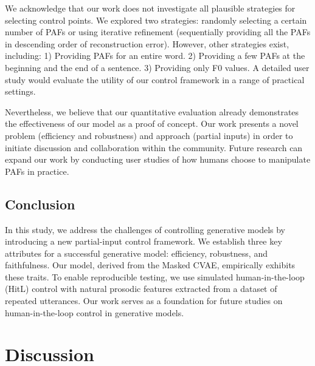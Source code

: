 \documentclass[a4paper,12pt,twoside,openright]{report}
\newcommand{\crit}[1]{\textcolor{red}{#1}}
\begin{document}
We acknowledge that our work does not investigate all plausible strategies for selecting control points. We explored two strategies: randomly selecting a certain number of PAFs or using iterative refinement (sequentially providing all the PAFs in descending order of reconstruction error). However, other strategies exist, including: 1) Providing PAFs for an entire word. 2) Providing a few PAFs at the beginning and the end of a sentence. 3) Providing only F0 values. A detailed user study would evaluate the utility of our control framework in a range of practical settings.

Nevertheless, we believe that our quantitative evaluation already demonstrates the effectiveness of our model as a proof of concept. Our work presents a novel problem (efficiency and robustness) and approach (partial inputs) in order to initiate discussion and collaboration within the community. Future research can expand our work by conducting user studies of how humans choose to manipulate PAFs in practice.

\subsection{Conclusion}

In this study, we address the challenges of controlling generative models by introducing a new partial-input control framework. We establish three key attributes for a successful generative model: efficiency, robustness, and faithfulness. Our model, derived from the Masked CVAE, empirically exhibits these traits. To enable reproducible testing, we use simulated human-in-the-loop (HitL) control with natural prosodic features extracted from a dataset of repeated utterances. Our work serves as a foundation for future studies on human-in-the-loop control in generative models.


\section{Discussion}

%
\end{document}
